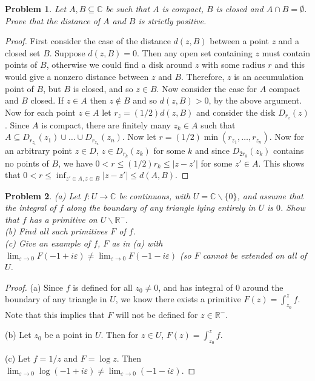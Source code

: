 \documentclass{article}
\newtheorem{problem}{Problem}
\begin{document}
\begin{problem}
Let $A, B \subseteq \mathbb{C}$ be such that $A$ is compact, $B$ is closed and $A \cap B = \emptyset$. Prove that the distance of $A$ and $B$ is strictly positive.
\end{problem}
\begin{proof}
First consider the case of the distance $d(z, B)$ between a point $z$ and a closed set $B$. Suppose  $d(z, B) = 0$. Then any open set containing $z$ must contain points of $B$, otherwise we could find a disk around $z$ with some radius $r$ and this would give a nonzero distance between $z$ and $B$. Therefore, $z$ is an accumulation point of $B$, but $B$ is closed, and so $z \in B$. Now consider the case for $A$ compact and $B$ closed. If $z \in A$ then $z \notin B$ and so $d(z, B) > 0$, by the above argument. Now for each point $z \in A$ let $r_z = (1/2) d(z,B)$ and consider the disk $D_{r_z}(z)$. Since $A$ is compact, there are finitely many $z_k \in A$ such that $A \subseteq D_{r_{z_1}}(z_1) \cup \dots \cup D_{r_{z_n}}(z_n)$. Now let $r = (1/2) \min (r_{z_1}, \dots , r_{z_n})$. Now for an arbitrary point $z \in D$, $z \in D_{r_{k}}(z_k)$ for some $k$ and since $D_{2r_k}(z_k)$ contains no points of $B$, we have $0 < r \leq (1/2)r_k \leq |z-z'|$ for some $z' \in A$. This shows that $0 < r \leq \inf_{z' \in A, z \in B} |z-z'| \leq d(A,B)$.
\end{proof}

\begin{problem}
(a) Let $f : U \rightarrow \mathbb{C}$ be continuous, with $U = \mathbb{C} \backslash \{0\}$, and assume that the integral of $f$ along the boundary of any triangle lying entirely in $U$ is $0$. Show that $f$ has a primitive on $U \backslash \mathbb{R}^-$.\\
(b) Find all such primitives $F$ of $f$.\\
(c) Give an example of $f$, $F$ as in (a) with $\lim_{\varepsilon \rightarrow 0} F(-1 + i \varepsilon) \neq \lim_{\varepsilon \rightarrow 0} F(-1 - i \varepsilon)$ (so $F$ cannot be extended on all of $U$.
\end{problem}
\begin{proof}
(a) Since $f$ is defined for all $z_0 \neq 0$, and has integral of $0$ around the boundary of any triangle in $U$, we know there exists a primitive $F(z) = \int_{z_0}^z f$. Note that this implies that $F$ will not be defined for $z \in \mathbb{R}^-$.

(b) Let $z_0$ be a point in $U$. Then for $z \in U$, $F(z) = \int_{z_0}^{z} f$.

(c) Let $f = 1/z$ and $F = \log z$. Then $\lim_{\varepsilon \rightarrow 0} \log (-1 + i \varepsilon) \neq \lim_{\varepsilon \rightarrow 0} (-1 - i \varepsilon)$.
\end{proof}
\end{document}
